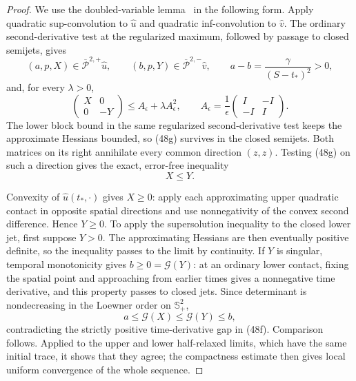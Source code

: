 \documentclass{smfart}
\theoremstyle{definition}
\newcommand{\1}{\mathbf 1}
\begin{document}
\begin{proof}
We use the doubled-variable lemma~\cite{CIL1992} in the following form.
Apply quadratic sup-convolution to $\widehat u$ and quadratic
inf-convolution to $\widehat v$.  The ordinary second-derivative test
at the regularized maximum, followed by passage to closed semijets, gives
\begin{equation}
(a,p,X)\in\overline{\mathcal P}^{2,+}\widehat u,\qquad
(b,p,Y)\in\overline{\mathcal P}^{2,-}\widehat v,\qquad
a-b=\frac{\gamma}{(S-t_ *)^2}>0,
\tag{48f}
\end{equation}
and, for every $\lambda>0$,
\begin{equation}
\begin{pmatrix}X&0\\0&-Y\end{pmatrix}
\leq A_ \epsilon+\lambda A_ \epsilon^2,\qquad
A_ \epsilon=\frac1\epsilon
\begin{pmatrix}I&-I\\-I&I\end{pmatrix}.
\tag{48g}
\end{equation}
The lower block bound in the same regularized second-derivative test
keeps the approximate Hessians bounded, so (48g) survives in the
closed semijets.  Both matrices on its right annihilate every common
direction $(z,z)$.  Testing (48g) on such a direction gives the
exact, error-free inequality
\begin{equation}
X\leq Y.
\tag{48h}
\end{equation}

Convexity of $\widehat u(t_ *,\cdot)$ gives $X\geq0$: apply each
approximating upper quadratic contact in opposite spatial directions
and use nonnegativity of the convex second difference.  Hence $Y\geq0$.
To apply the supersolution inequality to the closed lower jet, first
suppose $Y>0$.  The approximating Hessians are then eventually positive
definite, so the inequality passes to the limit by continuity.
If $Y$ is singular, temporal monotonicity gives $b\geq0=\mathcal G(Y)$:
at an ordinary lower contact, fixing the spatial point and approaching
from earlier times gives a nonnegative time derivative, and this
property passes to closed jets.  Since determinant is nondecreasing
in the Loewner order on $\mathbb S_ +^2$,
\begin{equation*}
a\leq \mathcal G(X)\leq \mathcal G(Y)\leq b,
\end{equation*}
contradicting the strictly positive time-derivative gap in (48f).
Comparison follows.  Applied to the upper and lower half-relaxed
limits, which have the same initial trace, it shows that they agree;
the compactness estimate then gives local uniform convergence of the
whole sequence.


\end{proof}
\end{document}
